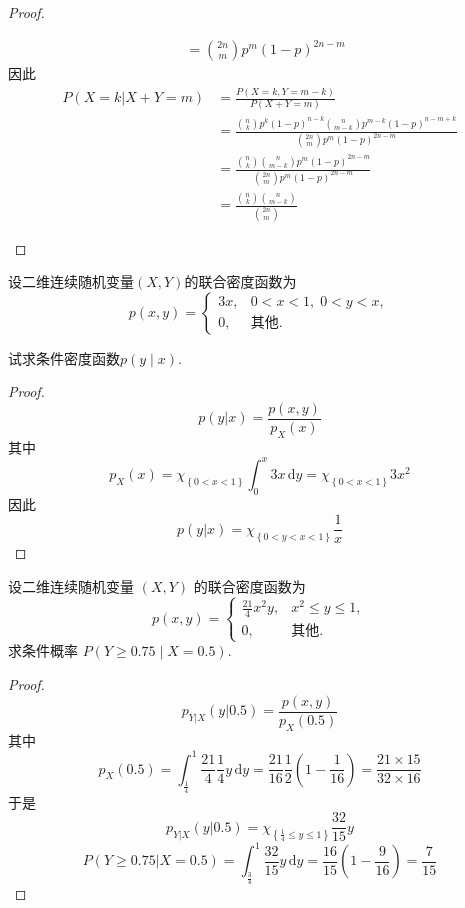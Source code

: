 \documentclass[../main.tex]{subfiles}
\begin{document}
\begin{proof}
\begin{enumerate}
\[\begin{aligned}
       &= \binom{ 2n }{m  }p^{m}\left( 1-p \right)^{2n-m}  
   \end{aligned} 
    \] 因此 \[
   \begin{aligned}
    P\left( X= k|X+ Y= m \right)&= \frac{P\left( X= k, Y= m-k \right)  }{P\left( X+ Y = m\right)  } \\ 
     &= \frac{\binom{ n }{ k }p^{k}\left( 1-p \right)^{n-k} \binom{ n }{m-k  }p^{m-k}\left( 1-p \right)^{n-m+ k}     }{ \binom{ 2n }{m  }p^{m}\left( 1-p \right)^{2n-m}  }   \\ 
      &= \frac{\binom{ n }{ k }\binom{ n }{ m-k }p^{m}\left( 1-p \right)^{2n-m}    }{\binom{ 2n }{m  }p^{m}\left( 1-p \right)^{2n-m}   }\\ 
       &= \frac{\binom{ n }{ k }\binom{ n }{ m-k }   }{\binom{ 2n }{m  }  }
   \end{aligned}
    \]
  \end{enumerate}
  
\end{proof}
\begin{exercise}{}{}
设二维连续随机变量\((X,Y)\)的联合密度函数为
\[
p(x,y)=
\begin{cases}
3x, & 0<x<1,\; 0<y<x,\\
0,  & \text{其他}.
\end{cases}
\]

试求条件密度函数\(p(y\mid x)\).
\end{exercise}

\begin{proof}
   \[
   p(y|x)= \frac{p\left( x,y \right)  }{p_{X}\left( x \right)  } 
   \]其中 \[
   p_{X}\left( x \right)=\chi _{\left\{ 0< x< 1 \right\}} \int_{0}^{x} 3x\,\mathrm{d} y= \chi _{\left\{ 0< x< 1 \right\}}3x^{2}
   \]因此 \[
   p\left( y|x \right) =\chi _{\left\{ 0<y<  x< 1 \right\}}\frac{1 }{x } 
   \]
\end{proof}
\begin{exercise}{}{}
设二维连续随机变量 $(X,Y)$ 的联合密度函数为
\[
p(x,y) = \begin{cases}
\frac{21}{4}x^2y, & x^2 \leqslant y \leqslant 1, \\
0, & \text{其他}.
\end{cases}
\]
求条件概率 $P(Y \geqslant 0.75 \mid X = 0.5)$.
\end{exercise}

\begin{proof}
  \[
  p_{Y|X}\left( y|0.5 \right)=  \frac{p\left( x,y \right)  }{p_{X}\left( 0.5 \right)  } 
  \]其中 \[
  p_{X}\left( 0.5 \right)= \int_{\frac{1}{4}}^{1}\frac{21}{4}\frac{1}{4}y\,\mathrm{d} y= \frac{21}{16} \frac{1}{2}\left( 1- \frac{1}{16} \right)= \frac{21\times 15 }{32\times 16 }   
  \]于是 \[
  p_{Y|X}\left( y|0.5 \right)= \chi _{\left\{ \frac{1}{4}\le y\le 1 \right\}}\frac{32 }{15 }y  
  \] \[
  P\left( Y\ge 0.75| X= 0.5 \right)= \int_{\frac{3}{4}}^{1}  \frac{32 }{15 }y\,\mathrm{d} y= \frac{16}{15}\left( 1- \frac{9}{16} \right)= \frac{7}{15}   
  \]
\end{proof}
\end{document}
